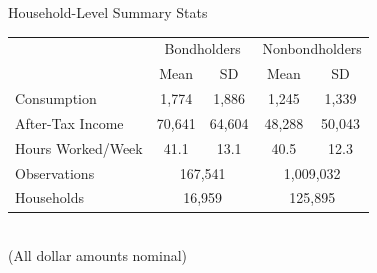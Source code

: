 \documentclass{beamer}
\begin{document}
\begin{frame}{Household-Level Summary Stats}
\begin{center}
\begin{tabular}{lcccc}
                  & \multicolumn{2}{c}{Bondholders} & \multicolumn{2}{c}{Nonbondholders} \\
                  & Mean   & SD                     & Mean   & SD \\ \hline
Consumption       & 1,774  & 1,886                  & 1,245  & 1,339 \\
After-Tax Income  & 70,641 & 64,604                 & 48,288 & 50,043 \\
Hours Worked/Week & 41.1   & 13.1                   & 40.5   & 12.3 \\ \hline
Observations      & \multicolumn{2}{c}{167,541}     & \multicolumn{2}{c}{1,009,032} \\
Households        & \multicolumn{2}{c}{16,959}      & \multicolumn{2}{c}{125,895} \\ \hline
\end{tabular} \\
(All dollar amounts nominal)
\end{center}
\end{frame}
\end{document}
